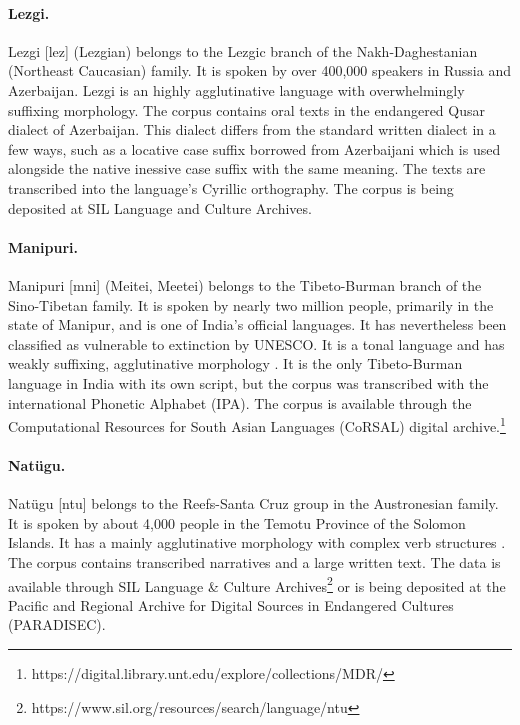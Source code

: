 \paragraph{Lezgi.} 
Lezgi [lez] (Lezgian) belongs to the Lezgic branch of the Nakh-Daghestanian (Northeast Caucasian) family. It is spoken by over 400,000 speakers in Russia and Azerbaijan. Lezgi is an highly agglutinative language with overwhelmingly suffixing morphology. The corpus contains oral texts in the endangered Qusar dialect of Azerbaijan. This dialect differs from the standard written dialect in a few ways, such as a locative case suffix borrowed from Azerbaijani which is used alongside the native inessive case suffix with the same meaning. The texts are transcribed into the language's Cyrillic orthography. The corpus is being deposited at SIL Language and Culture Archives.

\paragraph{Manipuri.}
Manipuri [mni] (Meitei, Meetei) belongs to the Tibeto-Burman branch of the Sino-Tibetan family. It is spoken by nearly two million people, primarily in the state of Manipur, and is one of India's official languages. It has nevertheless been classified as vulnerable to extinction by UNESCO. It is a tonal language and has weakly suffixing, agglutinative morphology \citep{Chelliah-1997}. It is the only Tibeto-Burman language in India with its own script, but the corpus was transcribed with the international Phonetic Alphabet (IPA). The corpus is available through the Computational Resources for South Asian Languages (CoRSAL) digital archive.\footnote{https://digital.library.unt.edu/explore/collections/MDR/}

\paragraph{Natügu.}
Natügu [ntu] belongs to the Reefs-Santa Cruz group in the Austronesian family. It is spoken by about 4,000 people in the Temotu Province of the Solomon Islands. It has a mainly agglutinative morphology with complex verb structures \citep{naess_ntu_2008}. The corpus contains transcribed narratives and a large written text. The data is available through SIL Language & Culture Archives\footnote{https://www.sil.org/resources/search/language/ntu} or is being deposited at the Pacific and Regional Archive for Digital Sources in Endangered Cultures (PARADISEC).

